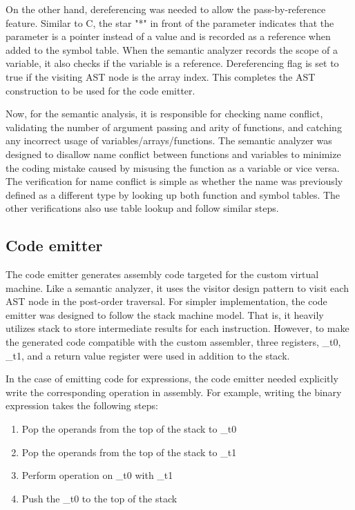 \documentclass[manuscript,screen,nonacm]{acmart}
\begin{document}
On the other hand, dereferencing was needed to allow the pass-by-reference feature. Similar to C, the star "*" in front of the parameter indicates that the parameter is a pointer instead of a value and is recorded as a reference when added to the symbol table. When the semantic analyzer records the scope of a variable, it also checks if the variable is a reference. Dereferencing flag is set to true if the visiting AST node is the array index. This completes the AST construction to be used for the code emitter.

Now, for the semantic analysis, it is responsible for checking name conflict, validating the number of argument passing and arity of functions, and catching any incorrect usage of variables/arrays/functions. The semantic analyzer was designed to disallow name conflict between functions and variables to minimize the coding mistake caused by misusing the function as a variable or vice versa. The verification for name conflict is simple as whether the name was previously defined as a different type by looking up both function and symbol tables. The other verifications also use table lookup and follow similar steps.

\subsection{Code emitter}
The code emitter generates assembly code targeted for the custom virtual machine. Like a semantic analyzer, it uses the visitor design pattern to visit each AST node in the post-order traversal.
For simpler implementation, the code emitter was designed to follow the stack machine model. That is, it heavily utilizes stack to store intermediate results for each instruction. However, to make the generated code compatible with the custom assembler, three registers, \_t0, \_t1, and a return value register were used in addition to the stack. 

In the case of emitting code for expressions, the code emitter needed explicitly write the corresponding operation in assembly. For example, writing the binary expression takes the following steps: 
\begin{enumerate}
    \item Pop the operands from the top of the stack to \_t0
    \item Pop the operands from the top of the stack to \_t1
    \item Perform operation on \_t0 with \_t1 
    \item Push the \_t0 to the top of the stack
\end{enumerate}
\end{document}
